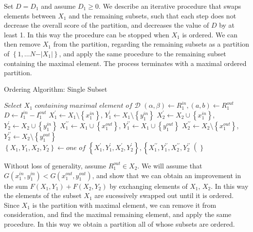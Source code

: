 \documentclass{article}
\theoremstyle{case}
\begin{document}
Set $D = D_1$ and assume $D_1 \geq 0$. We describe an iterative procedure that swaps elements between $X_1$ and the remaining subsets, such that each step does not decrease the overall score of the partition, and decreases the value of $D$ by at least 1. In this way the procedure can be stopped when $X_1$ is ordered. We can then remove $X_1$ from the partition, regarding the remaining subsets as a partition of $\left\lbrace 1, \dots N-\vert X_1 \vert\right\rbrace$, and apply the same procedure to the remaining subset containing the maximal element. The process terminates with a maximal ordered partition.

\begin{algorithm}
\caption{Ordering Algorithm: Single Subset}
\begin{algorithmic}[1]
\State $\textit{Select } X_1 \textit{ containing maximal element of } \mathcal{D}$
\State $\left( \alpha , \beta \right) \gets R_1^{in}, \left( a,b \right) \gets R_1^{out}$
\State $D \gets I_1^{in} - I_1^{out}$
\State $X_1^\prime \gets X_1\setminus \left\lbrace x_1^{in}\right\rbrace$, $Y_1^{\prime} \gets X_1\setminus \left\lbrace y_1^{in}\right\rbrace$
\State $X_2^{\prime} \gets X_2\cup \left\lbrace x_1^{in}\right\rbrace$, $Y_2^{\prime} \gets X_2\cup \left\lbrace y_1^{in}\right\rbrace$
\EndIf
{}
\State $X_1^{\prime\prime} \gets X_1\cup \left\lbrace x_1^{out}\right\rbrace$, $Y_1^{\prime\prime} \gets X_1\cup \left\lbrace y_1^{out}\right\rbrace$
\State $X_2^{\prime\prime} \gets X_2\setminus \left\lbrace x_1^{out}\right\rbrace$, $Y_2^{\prime\prime} \gets X_2\setminus \left\lbrace y_1^{out}\right\rbrace$
\EndIf
{}
\State $\left\lbrace X_1, Y_1, X_2, Y_2 \right\rbrace \gets \textit{one of } \left\lbrace X_1^{\prime}, Y_1^{\prime}, X_2^{\prime}, Y_2^{\prime}\right\rbrace, \left\lbrace X_1^{\prime\prime}, Y_1^{\prime\prime}, X_2^{\prime\prime}, Y_2^{\prime\prime}\right(\rbrace$
\EndIf
{}
\EndWhile
\end{algorithmic}
\end{algorithm}

Without loss of generality, assume $R_1^{out} \in X_2$. We will assume that $G(x_1^{in}, y_1^{in}) < G(x_1^{out}, y_1^{out})$, and show that we can obtain an improvement in the sum $F(X_1, Y_1) + F(X_2, Y_2)$ by exchanging elements of $X_1$, $X_2$. In this way the elements of the subset $X_1$ are sucessively swapped out until it is ordered. Since $X_1$ is the partition with maximal element, we can remove it from consideration, and find the maximal remaining element, and apply the same procedure. In this way we obtain a partition all of whose subsets are ordered.
\end{document}
